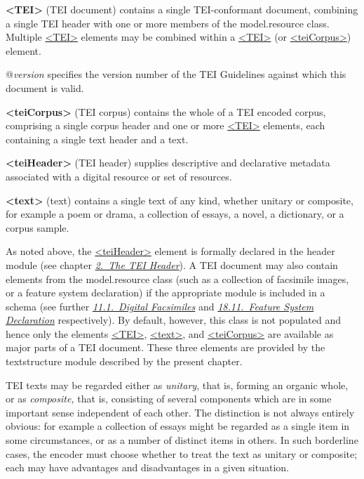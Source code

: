 \begin{sansreflist}
  
\item [\textbf{<TEI>}] (TEI document) contains a single TEI-conformant document, combining a single TEI header with one or more members of the \textsf{model.resource} class. Multiple \hyperref[TEI.TEI]{<TEI>} elements may be combined within a \hyperref[TEI.TEI]{<TEI>} (or \hyperref[TEI.teiCorpus]{<teiCorpus>}) element.\hfil\\[-10pt]\begin{sansreflist}
    \item[@{\itshape version}]
  specifies the version number of the TEI Guidelines against which this document is valid.
\end{sansreflist}  
\item [\textbf{<teiCorpus>}] (TEI corpus) contains the whole of a TEI encoded corpus, comprising a single corpus header and one or more \hyperref[TEI.TEI]{<TEI>} elements, each containing a single text header and a text.
\item [\textbf{<teiHeader>}] (TEI header) supplies descriptive and declarative metadata associated with a digital resource or set of resources.
\item [\textbf{<text>}] (text) contains a single text of any kind, whether unitary or composite, for example a poem or drama, a collection of essays, a novel, a dictionary, or a corpus sample.
\end{sansreflist}
 As noted above, the \hyperref[TEI.teiHeader]{<teiHeader>} element is formally declared in the \textsf{header} module (see chapter \textit{\hyperref[HD]{2.\ The TEI Header}}). A TEI document may also contain elements from the \textsf{model.resource} class (such as a collection of facsimile images, or a feature system declaration) if the appropriate module is included in a schema (see further \textit{\hyperref[PHFAX]{11.1.\ Digital Facsimiles}} and \textit{\hyperref[FD]{18.11.\ Feature System Declaration}} respectively). By default, however, this class is not populated and hence only the elements \hyperref[TEI.TEI]{<TEI>}, \hyperref[TEI.text]{<text>}, and \hyperref[TEI.teiCorpus]{<teiCorpus>} are available as major parts of a TEI document. These three elements are provided by the \textsf{textstructure} module described by the present chapter.\par
TEI texts may be regarded either as \textit{unitary}, that is, forming an organic whole, or as \textit{composite,} that is, consisting of several components which are in some important sense independent of each other. The distinction is not always entirely obvious: for example a collection of essays might be regarded as a single item in some circumstances, or as a number of distinct items in others. In such borderline cases, the encoder must choose whether to treat the text as unitary or composite; each may have advantages and disadvantages in a given situation.\par
